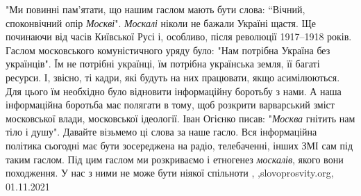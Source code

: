 "Ми повинні пам’ятати, що нашим гаслом мають бути слова: “Вічний, споконвічний
опір \emph{Москві}". \emph{Москалі} ніколи не бажали Україні щастя. Ще починаючи від часів
Київської Русі і, особливо, після революції 1917–1918 років. Гаслом
московського комуністичного уряду було: "Нам потрібна Україна без українців".
Їм не потрібні українці, їм потрібна українська земля, її багаті ресурси. І,
звісно, ті кадри, які будуть на них працювати, якщо асимілюються. Для цього їм
необхідно було відновити інформаційну боротьбу з нами. А наша інформаційна
боротьба має полягати в тому, щоб розкрити варварський зміст московської влади,
московської ідеології.  Іван Огієнко писав: "\emph{Москва} гнітить нам тіло і душу".
Давайте візьмемо ці слова за наше гасло. Вся інформаційна політика сьогодні має
бути зосереджена на радіо, телебаченні, інших ЗМІ сам під таким гаслом. Під цим
гаслом ми розкриваємо і етногенез \emph{москалів}, якого вони походження. У нас з ними
не може бути ніякої спільноти
, ,slovoprosvity.org, 01.11.2021
